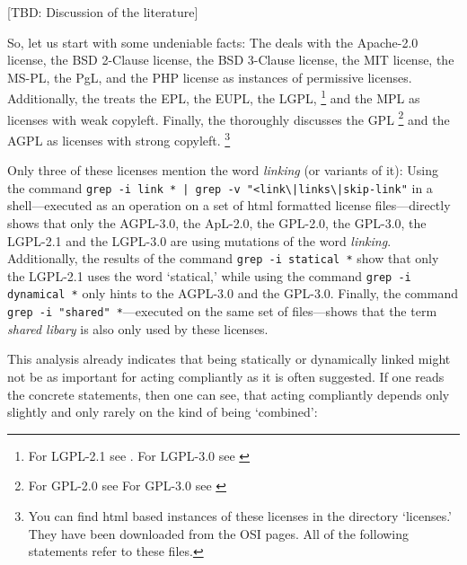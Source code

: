 [TBD: Discussion of the literature]

So, let us start with some undeniable facts: The \oslic{} deals with 
the Apache-2.0 license,\citeAPL{}
the BSD 2-Clause license,\citeBSDsimple{} 
the BSD 3-Clause license,\citeBSDnew{} 
the MIT license,\citeMIT{} 
the MS-PL,\citeMSPL{} 
the PgL,\citePGL{}
and the PHP license\citePHP{} 
as instances of permissive licenses.
Additionally, the \oslic{} treats 
the EPL,\citeEPL{} 
the EUPL,\citeEUPL{} 
the LGPL,
  \footnote{For LGPL-2.1 see \cite[cf.][\nopage wp]{Lgpl21OsiLicense1999a}. 
  For LGPL-3.0 see \cite [cf.][\nopage wp]{Lgpl30OsiLicense2007a} } 
and the MPL\citeMPL{}
as licenses with weak copyleft. Finally, the \oslic{} thoroughly discusses 
the GPL%
  \footnote{For GPL-2.0 see \cite [cf.][\nopage wp]{Gpl20OsiLicense1991a} 
  For GPL-3.0 see \cite [cf.][\nopage wp]{Gpl30OsiLicense2007a} } 
and the AGPL\citeAGPL{}
as licenses with strong copyleft.%
  \footnote{You can find html based instances of these licenses in the
    \oslic{} directory `licenses.' They have been downloaded from the
    OSI pages. All of the following statements refer to these files.}

Only three of these licenses mention the word \emph{linking} (or variants of
it): Using the command \texttt{grep -i link * | grep -v
"<link\textbackslash{}|links\textbackslash{}|skip-link"} in a shell---executed
as an operation on a set of html formatted license files---directly shows that
only the AGPL-3.0, the ApL-2.0, the GPL-2.0, the GPL-3.0, the LGPL-2.1 and the
LGPL-3.0 are using mutations of the word \emph{linking}. Additionally, the
results of the command \texttt{grep -i statical *} show that only the LGPL-2.1
uses the word `statical,' while using the command \texttt{grep -i dynamical *}
only hints to the AGPL-3.0 and the GPL-3.0. Finally, the command \texttt{grep -i
"shared" *}---executed on the same set of files---shows that the term
\emph{shared libary} is also only used by these licenses.

This analysis already indicates that being statically or dynamically linked
might not be as important for acting compliantly as it is often suggested.
% 
If one reads the concrete statements, then one can see, that acting compliantly
depends only slightly and only rarely on the kind of being `combined':

